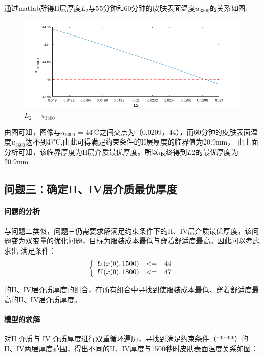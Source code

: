 \documentclass{cumcmthesis}
\begin{document}
    通过matlab所得II层厚度\(L_2\)与55分钟和60分钟的皮肤表面温度\(u_{3300}\)的关系如图:

    \begin{figure}[h] 
        \centering 
        \includegraphics[scale=0.9]{../figure/ques2result.png} 
        \caption{\(L_2 - u_{3300}\)}\label{fig:one}    
    \end{figure}


    由图可知，图像与\(u_{3300}\) = 44℃之间交点为（0.0209，44），而60分钟的皮肤表面温度\(u_{3600}\)达不到47℃,由此可得满足约束条件的II层厚度的临界值为20.9mm，
    由上面分析可知，该临界厚度为II层介质最优厚度。所以最终得到\(L2\)的最优厚度为20.9mm


     \subsection{问题三：确定II、IV层介质最优厚度} 
        \paragraph{问题的分析} 
        与问题二类似，问题三仍需要求解满足约束条件下的II、IV层介质最优厚度，该问题变为双变量的优化问题，目标为服装成本最低与穿着舒适度最高。因此可以考虑求出
    满足条件：
    $$
    \left \{
    \begin{array}{r c l}
    U(x(0),1500)    & <= &  44 \\
    U(x(0),1800)    & <= &  47 \\
    \end{array}
    \right .
    $$


    的II、IV层介质厚度的组合，在所有组合中寻找到使服装成本最低、穿着舒适度最高的II、IV层介质厚度。
        \paragraph{模型的求解} 
          
        对II 介质与 IV 介质厚度进行双重循环遍历，寻找到满足约束条件（*****）的II、IV两层厚度范围，得出不同的II、IV厚度与1500秒时皮肤表面温度关系如图：
     
\end{document}
